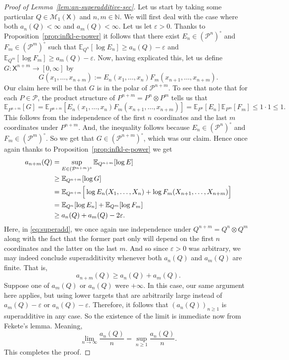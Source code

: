 \documentclass[11pt]{article}
\newcommand{\E}{\mathbb{E}}
\newcommand{\Pcal}{\mathcal{P}}
\newcommand{\X}{\mathsf{X}}
\theoremstyle{definition}
\theoremstyle{definition}
\begin{document}
\begin{proof}[Proof of Lemma~\ref{lem:an-superadditive-sec}]
Let us start by taking some particular $Q\in\mathcal M_1(\X)$ and $n,m\in\mathbb N$. We will first deal with the case where both $a_n(Q)<\infty$ and $a_m(Q)<\infty$. Let us let $\varepsilon>0$. Thanks to Proposition~\ref{prop:infkl-e-power} it follows that there exist $E_n\in(\Pcal^n)^{\circ}$ and $F_m\in(\Pcal^m)^{\circ}$ such that $\E_{Q^n}[\log E_n]\ge a_n(Q)-\varepsilon$ and $\E_{Q^m}[\log F_m]\ge a_m(Q)-\varepsilon$. Now, having explicated this, let us define $G: \X^{n+m}\to[0,\infty]$ by
\[
G(x_1,\dots,x_{n+m}):=E_n(x_1,\dots,x_n)F_m(x_{n+1},\dots,x_{n+m}).
\]
Our claim here will be that $G$ is in the polar of $\Pcal^{n+m}$. To see that note that for each $P\in\Pcal$, the product structure of $P^{n+m}=P^{n}\otimes P^{m}$ tells us that
\[
\E_{P^{n+m}}[G]=\E_{P^{n+m}}\left[E_n(x_1,\dots,x_n)F_m(x_{n+1},\dots,x_{n+m})\right]=\E_{P^n}[E_n]\E_{P^m}[F_m]\le 1\cdot 1\le 1.
\]
This follows from the independence of the first $n$ coordinates and the last $m$ coordinates under $P^{n+m}$. And, the inequality follows because $E_n\in(\Pcal^n)^{\circ}$ and $F_m\in(\Pcal^m)^{\circ}$. So we get that $G\in(\Pcal^{n+m})^{\circ}$, which was our claim. Hence once again thanks to Proposition~\ref{prop:infkl-e-power} we get
\begin{align}
a_{n+m}(Q)&=\sup_{E\in(\Pcal^{n+m})^{\circ}}\E_{Q^{n+m}}[\log E]\notag\\
&\ge \E_{Q^{n+m}}[\log G]\notag\\
&=\E_{Q^{n+m}}\Big[\log E_n(X_1,\dots,X_n)+\log F_m(X_{n+1},\dots,X_{n+m})\Big]\notag\\
&=\E_{Q^n}[\log E_n]+\E_{Q^m}[\log F_m]\notag\\
&\ge a_n(Q)+a_m(Q)-2\varepsilon.\label{eq:superadd}
\end{align}
Here, in \eqref{eq:superadd}, we once again use independence under $Q^{n+m}=Q^n\otimes Q^m$ along with the fact that the former part only will depend on the first $n$ coordinates and the latter on the last $m$. And so since $\varepsilon>0$ was arbitrary, we may indeed conclude superadditivity whenever both $a_n(Q)$ and $a_m(Q)$ are finite. That is,
\[
a_{n+m}(Q)\ge a_n(Q)+a_m(Q).
\]
Suppose one of $a_m(Q)$ or $a_n(Q)$ were $+\infty$. In this case, our same argument here applies, but using lower targets that are arbitrarily large instead of $a_m(Q)-\varepsilon$ or $a_n(Q)-\varepsilon$. Therefore, it follows that $(a_n(Q))_{n\ge 1}$ is superadditive in any case. So the existence of the limit is immediate now from Fekete's lemma. Meaning,
\[
\lim_{n\to\infty} \frac{a_n(Q)}{n}=\sup_{n\ge 1}\frac{a_n(Q)}{n}.
\]
This completes the proof.
\end{proof}
\end{document}
